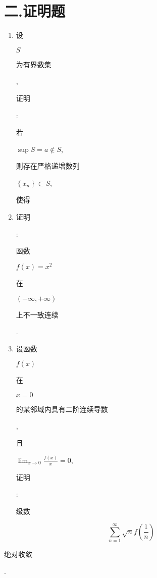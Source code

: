 \documentclass[10pt]{article}
\begin{document}
\section{二.证明题}
\begin{enumerate}
  \item \begin{CJK}{UTF8}{mj}设\end{CJK} $S$ \begin{CJK}{UTF8}{mj}为有界数集\end{CJK}, \begin{CJK}{UTF8}{mj}证明\end{CJK}: \begin{CJK}{UTF8}{mj}若\end{CJK} $\sup S=a \notin S$, \begin{CJK}{UTF8}{mj}则存在严格递增数列\end{CJK} $\left\{x_{n}\right\} \subset S$, \begin{CJK}{UTF8}{mj}使得\end{CJK}

  \item \begin{CJK}{UTF8}{mj}证明\end{CJK}: \begin{CJK}{UTF8}{mj}函数\end{CJK} $f(x)=x^{2}$ \begin{CJK}{UTF8}{mj}在\end{CJK} $(-\infty,+\infty)$ \begin{CJK}{UTF8}{mj}上不一致连续\end{CJK}.

  \item \begin{CJK}{UTF8}{mj}设函数\end{CJK} $f(x)$ \begin{CJK}{UTF8}{mj}在\end{CJK} $x=0$ \begin{CJK}{UTF8}{mj}的某邻域内具有二阶连续导数\end{CJK}, \begin{CJK}{UTF8}{mj}且\end{CJK} $\lim _{x \rightarrow 0} \frac{f(x)}{x}=0$, \begin{CJK}{UTF8}{mj}证明\end{CJK}: \begin{CJK}{UTF8}{mj}级数\end{CJK}

\end{enumerate}
$$
\sum_{n=1}^{\infty} \sqrt{n} f\left(\frac{1}{n}\right)
$$
\begin{CJK}{UTF8}{mj}绝对收敛\end{CJK}.
\end{document}
